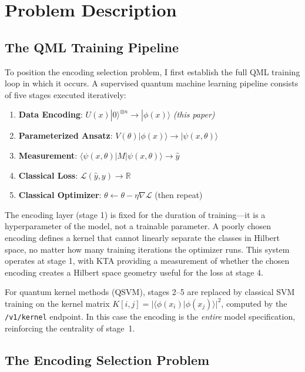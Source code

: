 \documentclass[sigconf,nonacm]{acmart}
\begin{document}
\section{Problem Description}

\subsection{The QML Training Pipeline}

To position the encoding selection problem, I first establish the full QML training
loop in which it occurs. A supervised quantum machine learning pipeline consists of
five stages executed iteratively:

\begin{enumerate}
  \item \textbf{Data Encoding}: $U(x)|0\rangle^{\otimes n} \rightarrow |\phi(x)\rangle$
        \hfill \emph{(this paper)}
  \item \textbf{Parameterized Ansatz}: $V(\theta)|\phi(x)\rangle \rightarrow |\psi(x,\theta)\rangle$
  \item \textbf{Measurement}: $\langle\psi(x,\theta)|M|\psi(x,\theta)\rangle \rightarrow \hat{y}$
  \item \textbf{Classical Loss}: $\mathcal{L}(\hat{y}, y) \rightarrow \mathbb{R}$
  \item \textbf{Classical Optimizer}: $\theta \leftarrow \theta - \eta\nabla\mathcal{L}$
        (then repeat)
\end{enumerate}

The encoding layer (stage 1) is fixed for the duration of training---it is a
hyperparameter of the model, not a trainable parameter. A poorly chosen encoding
defines a kernel that cannot linearly separate the classes in Hilbert space, no
matter how many training iterations the optimizer runs. This system operates at
stage 1, with KTA providing a measurement of whether the chosen encoding creates a
Hilbert space geometry useful for the loss at stage 4.

For quantum kernel methods (QSVM), stages 2--5 are replaced by classical SVM
training on the kernel matrix
$K[i,j] = |\langle\phi(x_i)|\phi(x_j)\rangle|^2$,
computed by the \texttt{/v1/kernel} endpoint. In this case the encoding is the
\emph{entire} model specification, reinforcing the centrality of stage~1.

\subsection{The Encoding Selection Problem}
\end{document}
